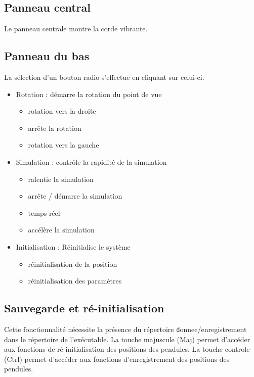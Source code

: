\subsection{Panneau central}
%
Le panneau centrale montre la corde vibrante. 
%
\subsection{Panneau du bas}
%
La sélection d'un bouton radio s'effectue en cliquant sur celui-ci. 
%
%
\begin{itemize}[leftmargin=1cm, label=, itemsep=0pt]
	\item Rotation : démarre la rotation du point de vue
	\begin{itemize}[leftmargin=1cm, label=, itemsep=0pt]
		\item rotation vers la droite
		\item arrête la rotation
		\item rotation vers la gauche
	\end{itemize}
	\item Simulation : contrôle la rapidité de la simulation
	\begin{itemize}[leftmargin=1cm, label=, itemsep=0pt]
		\item ralentie la simulation
		\item arrête / démarre la simulation
		\item temps réel
		\item accélère la simulation
	\end{itemize}
	\item Initialisation : Réinitialise le système
	\begin{itemize}[leftmargin=1cm, label=, itemsep=0pt]
		\item réinitialisation de la position
		\item réinitialisation des paramètres
	\end{itemize}
\end{itemize}
%
%
\subsection{Sauvegarde et ré-initialisation}
%
Cette fonctionnalité nécessite la présence du répertoire {\texttt donnee/enregistrement} dans le répertoire de l'exécutable.
La touche majuscule (Maj) permet d'accéder aux fonctions de ré-initialisation des positions des pendules.
La touche controle (Ctrl) permet d'accéder aux fonctions d'enregistrement des positions des pendules.

